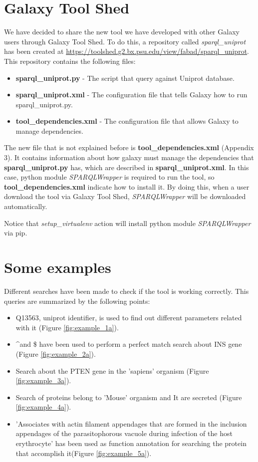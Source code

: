 \documentclass[12pt]{article}
\begin{document}
\section{Galaxy Tool Shed}
We have decided to share the new tool we have developed with other Galaxy users through Galaxy Tool Shed. To do this, a repository called \textit{sparql\_uniprot} has been created at \url{https://toolshed.g2.bx.psu.edu/view/fabad/sparql_uniprot}. This repository contains the following files:
\begin{itemize}
	\item \textbf{sparql\_uniprot.py} - The script that query against Uniprot database.
	\item \textbf{sparql\_uniprot.xml} - The configuration file that tells Galaxy how to run sparql\_uniprot.py.
	\item \textbf{tool\_dependencies.xml} - The configuration file that allows Galaxy to manage dependencies.
\end{itemize}

The new file that is not explained before is \textbf{tool\_dependencies.xml} (Appendix 3). It contains information about how galaxy must manage the dependencies that \textbf{sparql\_uniprot.py} has, which are described in \textbf{sparql\_uniprot.xml}. In this case, python module \textit{SPARQLWrapper} is required to run the tool, so \textbf{tool\_dependencies.xml} indicate how to install it. By doing this, when a user download the tool via Galaxy Tool Shed, \textit{SPARQLWrapper} will be downloaded automatically.

Notice that \textit{setup\_virtualenv} action will install python module \textit{SPARQLWrapper} via pip.

\clearpage

\section{Some examples}

Different searches have been made to check if the tool is working correctly. This queries are summarized by the following points: 
\begin{itemize}
	\item Q13563, uniprot identifier, is used to find out different parameters related with it (Figure \ref{fig:example_1a}). 
	\item \textasciicircum and \$ have been used to perform a perfect match search about INS gene (Figure \ref{fig:example_2a}). 
	\item Search about the PTEN gene in the 'sapiens' organism (Figure \ref{fig:example_3a}). 
	\item Search of proteins belong to 'Mouse' organism and It are secreted (Figure \ref{fig:example_4a}).
	\item 'Associates with actin filament appendages that are formed in the inclusion appendages of the parasitophorous vacuole during infection of the host erythrocyte' has been used as function annotation for searching the protein that accomplish it(Figure \ref{fig:example_5a}). 
\end{itemize}
\end{document}
